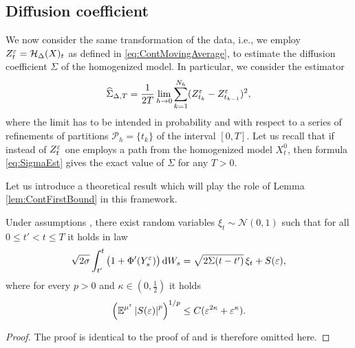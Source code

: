 \documentclass[10pt]{article}
\begin{document}
\subsection{Diffusion coefficient}

We now consider the same transformation of the data, i.e., we employ $Z^\varepsilon_t = \mathcal H_\Delta (X)_t$ as defined in \eqref{eq:ContMovingAverage}, to estimate the diffusion coefficient $\Sigma$ of the homogenized model. In particular, we consider the estimator
\begin{equation}
	\widehat \Sigma_{\Delta, T} = \frac1{2T} \lim_{h\to 0} \sum_{k=1}^{N_h} (Z^\varepsilon_{t_k} - Z^\varepsilon_{t_{k-1}})^2, 
\end{equation}
where the limit has to be intended in probability and with respect to a series of refinements of partitions $\mathcal P_h = \{t_k\}$ of the interval $[0, T]$. Let us recall that if instead of $Z^\varepsilon_t$ one employs a path from the homogenized model $X^0_t$, then formula \eqref{eq:SigmaEst} gives the exact value of $\Sigma$ for any $T > 0$.

Let us introduce a theoretical result which will play the role of Lemma \ref{lem:ContFirstBound} in this framework.
\begin{lemma} Under assumptions , there exist random variables $\xi_t \sim \mathcal N(0, 1)$ such that for all $0 \leq t' < t \leq T$ it holds in law
	\begin{equation}
		\sqrt{2\sigma} \int_{t'}^t \big(1 + \Phi'(Y^\varepsilon_s)\big) \,\mathrm{d} W_s = \sqrt{2\Sigma(t-t')} \, \xi_t + S(\varepsilon),
	\end{equation}
	where for every $p > 0$ and $\kappa \in (0, \frac12)$ it holds
	\begin{equation}
	\left( \operatorname{\mathbb{E}}^{\mu^\varepsilon} \left\lvert S(\varepsilon)\right\rvert^p \right)^{1/p} \leq C(\varepsilon^{2\kappa} + \varepsilon^\kappa).
	\end{equation}
\end{lemma}
\begin{proof} The proof is identical to the proof of \cite[Proposition 5.7]{PaS07} and is therefore omitted here. \end{proof}
\end{document}
